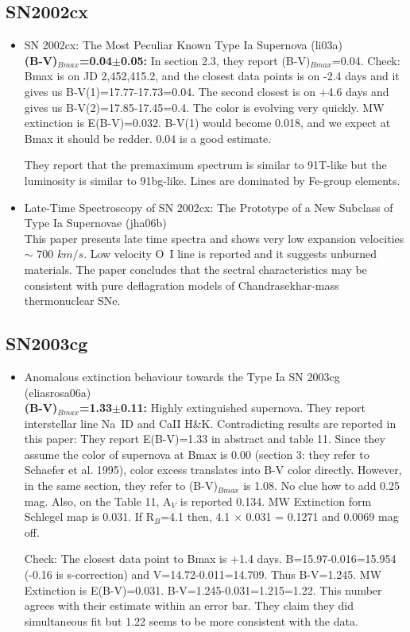 \subsection{\bf SN2002cx}
\begin{itemize}
\item SN 2002cx: The Most Peculiar Known Type Ia Supernova (li03a) \citet{li03a}\\
{\bf (B-V)$_{Bmax}$=0.04$\pm$0.05:} 
In section 2.3, they report (B-V)$_{Bmax}$=0.04.
Check: Bmax is on JD 2,452,415.2, and the closest data points is on -2.4 days and
it gives us B-V(1)=17.77-17.73=0.04. The second closest is on +4.6 days and gives
us B-V(2)=17.85-17.45=0.4.  The color is evolving very quickly. MW extinction is
E(B-V)=0.032. B-V(1) would become 0.018, and we expect at Bmax it should be redder.
0.04 is a good estimate. 

They report that the premaximum spectrum is similar to 91T-like but the luminosity
is similar to 91bg-like.  Lines are dominated by Fe-group elements.

\item Late-Time Spectroscopy of SN 2002cx: The Prototype of a New Subclass of 
Type Ia Supernovae (jha06b) \citet{jha06b}\\
This paper presents late time spectra and shows very low expansion velocities
$\sim $ 700 $km/s$.  Low velocity O~I line is reported and it suggests unburned
materials.   The paper concludes that the sectral characteristics may be
consistent with pure deflagration models of Chandrasekhar-mass thermonuclear SNe.  
\end{itemize}

\subsection{\bf SN2003cg}
\begin{itemize}
\item Anomalous extinction behaviour towards the Type Ia SN 2003cg (eliasrosa06a)
\citet{eliasrosa06a}\\
{\bf (B-V)$_{Bmax}$=1.33$\pm$0.11:} 
Highly extinguished supernova.  They report interstellar line Na~ID and
CaII H\&K.
Contradicting results are reported in this paper:
They report E(B-V)=1.33 in abstract and table 11. Since they assume the color
of supernova at Bmax is 0.00 (section 3: they refer to Schaefer et al. 1995),
color excess translates into B-V color directly.  However, in the same section,
they refer to (B-V)$_{Bmax}$ is 1.08.  No clue how to add 0.25 mag. 
Also, on the Table 11, A$_{V}$ is reported 0.134.  MW Extinction form Schlegel
map is 0.031.  If R$_{B}$=4.1 then, 4.1 $\times$ 0.031 = 0.1271 and 0.0069 mag
off.  

Check: The closest data point to Bmax is +1.4 days.  B=15.97-0.016=15.954 
(-0.16 is s-correction) and V=14.72-0.011=14.709.  Thus B-V=1.245.
MW Extinction is E(B-V)=0.031.  B-V=1.245-0.031=1.215=1.22.  This number
agrees with their estimate within an error bar.  They claim they did 
simultaneous fit but 1.22 seems to be more consistent with the data.
\end{itemize}

